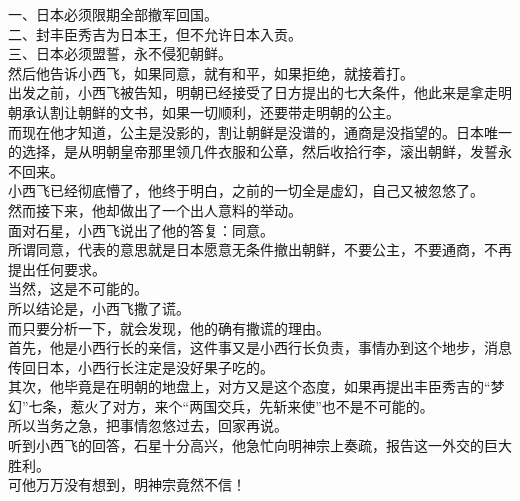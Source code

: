 \begin{multicols}{\theparacolNo}
一、日本必须限期全部撤军回国。\\

二、封丰臣秀吉为日本王，但不允许日本入贡。\\

三、日本必须盟誓，永不侵犯朝鲜。\\

然后他告诉小西飞，如果同意，就有和平，如果拒绝，就接着打。\\

出发之前，小西飞被告知，明朝已经接受了日方提出的七大条件，他此来是拿走明朝承认割让朝鲜的文书，如果一切顺利，还要带走明朝的公主。\\

而现在他才知道，公主是没影的，割让朝鲜是没谱的，通商是没指望的。日本唯一的选择，是从明朝皇帝那里领几件衣服和公章，然后收拾行李，滚出朝鲜，发誓永不回来。\\

小西飞已经彻底懵了，他终于明白，之前的一切全是虚幻，自己又被忽悠了。\\

然而接下来，他却做出了一个出人意料的举动。\\

面对石星，小西飞说出了他的答复：同意。\\

所谓同意，代表的意思就是日本愿意无条件撤出朝鲜，不要公主，不要通商，不再提出任何要求。\\

当然，这是不可能的。\\

所以结论是，小西飞撒了谎。\\

而只要分析一下，就会发现，他的确有撒谎的理由。\\

首先，他是小西行长的亲信，这件事又是小西行长负责，事情办到这个地步，消息传回日本，小西行长注定是没好果子吃的。\\

其次，他毕竟是在明朝的地盘上，对方又是这个态度，如果再提出丰臣秀吉的“梦幻”七条，惹火了对方，来个“两国交兵，先斩来使”也不是不可能的。\\

所以当务之急，把事情忽悠过去，回家再说。\\

听到小西飞的回答，石星十分高兴，他急忙向明神宗上奏疏，报告这一外交的巨大胜利。\\

可他万万没有想到，明神宗竟然不信！\\


\end{multicols}
